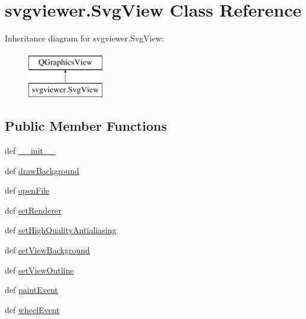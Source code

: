 \hypertarget{classsvgviewer_1_1SvgView}{}\section{svgviewer.\+Svg\+View Class Reference}
\label{classsvgviewer_1_1SvgView}
Inheritance diagram for svgviewer.\+Svg\+View\+:\begin{figure}[H]
\begin{center}
\leavevmode
\includegraphics[height=2.000000cm]{classsvgviewer_1_1SvgView}
\end{center}
\end{figure}
\subsection*{Public Member Functions}
\begin{DoxyCompactItemize}
\item 
def \hyperlink{classsvgviewer_1_1SvgView_a834810bc3490ef417fbd5bfedb57ec3a}{\+\_\+\+\_\+init\+\_\+\+\_\+}
\item 
def \hyperlink{classsvgviewer_1_1SvgView_a7cf0d94119b7cdc037a68eb793d362ef}{draw\+Background}
\item 
def \hyperlink{classsvgviewer_1_1SvgView_ad6f53129a174517fa77ad6ea2be86fa3}{open\+File}
\item 
def \hyperlink{classsvgviewer_1_1SvgView_a0db31ba394c6f7d3dfd833865760aa43}{set\+Renderer}
\item 
def \hyperlink{classsvgviewer_1_1SvgView_a00a607f9d77d529632889451fd27063a}{set\+High\+Quality\+Antialiasing}
\item 
def \hyperlink{classsvgviewer_1_1SvgView_a04a851e7d45f2bf0dd24c29228eaad26}{set\+View\+Background}
\item 
def \hyperlink{classsvgviewer_1_1SvgView_a716448950645f0c158e1ec1e3b013269}{set\+View\+Outline}
\item 
def \hyperlink{classsvgviewer_1_1SvgView_adc914c4f9fc71b9514ab9743c65b9e4e}{paint\+Event}
\item 
def \hyperlink{classsvgviewer_1_1SvgView_a5502bec19ccad73db253afeaac44e9a8}{wheel\+Event}
\end{DoxyCompactItemize}
